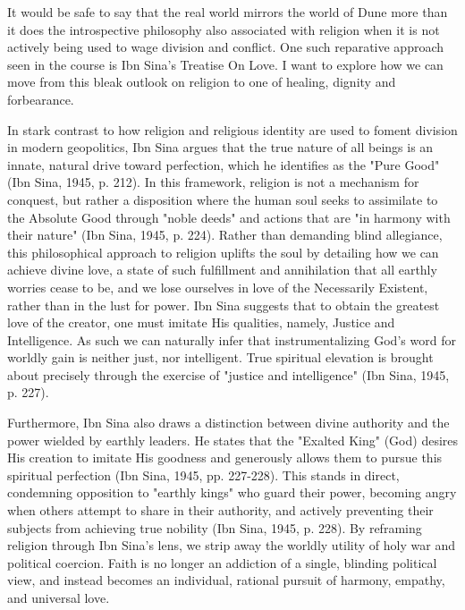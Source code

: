 \documentclass[12pt]{article}
\begin{document}
It would be safe to say that the real world mirrors the world of Dune more than it does the introspective philosophy also associated with religion when it is not actively being used to wage division and conflict. One such reparative approach seen in the course is Ibn Sina's Treatise On Love. I want to explore how we can move from this bleak outlook on religion to one of healing, dignity and forbearance.

\vspace{2em}

In stark contrast to how religion and religious identity are used to foment division in modern geopolitics, Ibn Sina argues that the true nature of all beings is an innate, natural drive toward perfection, which he identifies as the "Pure Good" (Ibn Sina, 1945, p. 212). In this framework, religion is not a mechanism for conquest, but rather a disposition where the human soul seeks to assimilate to the Absolute Good through "noble deeds" and actions that are "in harmony with their nature" (Ibn Sina, 1945, p. 224). Rather than demanding blind allegiance, this philosophical approach to religion uplifts the soul by detailing how we can achieve divine love, a state of such fulfillment and annihilation that all earthly worries cease to be, and we lose ourselves in love of the Necessarily Existent, rather than in the lust for power. Ibn Sina suggests that to obtain the greatest love of the creator, one must imitate His qualities, namely, Justice and Intelligence. As such we can naturally infer that instrumentalizing God's word for worldly gain is neither just, nor intelligent. True spiritual elevation is brought about precisely through the exercise of "justice and intelligence" (Ibn Sina, 1945, p. 227).

Furthermore, Ibn Sina also draws a distinction between divine authority and the power wielded by earthly leaders. He states that the "Exalted King" (God) desires His creation to imitate His goodness and generously allows them to pursue this spiritual perfection (Ibn Sina, 1945, pp. 227-228). This stands in direct, condemning opposition to "earthly kings" who guard their power, becoming angry when others attempt to share in their authority, and actively preventing their subjects from achieving true nobility (Ibn Sina, 1945, p. 228). By reframing religion through Ibn Sina's lens, we strip away the worldly utility of holy war and political coercion. Faith is no longer an addiction of a single, blinding political view, and instead becomes an individual, rational pursuit of harmony, empathy, and universal love.
\end{document}
